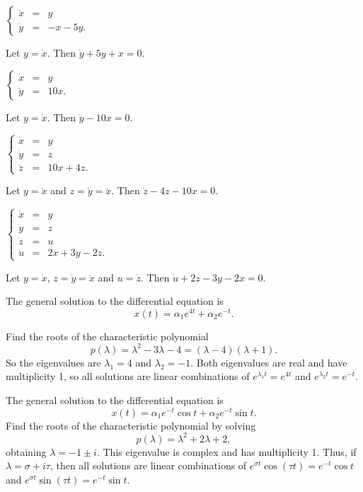  \ans $\left\{\begin{array}{rcl} \dot{x} & = & y \\
\dot{y} & = & -x-5y. \end{array}\right.$

\soln  Let $y = \dot{x}$.  Then $\dot{y}+5y+x=0$.


 \ans $\left\{\begin{array}{rcl} \dot{x} & = & y \\
\dot{y} & = & 10x. \end{array}\right.$

\soln  Let $y = \dot{x}$.  Then $\dot{y}-10x=0$.

\newpage
{} \ans $\left\{\begin{array}{rcl} \dot{x} & = & y \\
\dot{y} & = & z\\
\dot{z} & = & 10x+4z. \end{array}\right.$

\soln  Let $y = \dot{x}$ and $z=\dot{y}=\ddot{x}$.  Then 
$\dot{z}-4z-10x=0$.


 \ans $\left\{\begin{array}{rcl} \dot{x} & = & y \\
\dot{y} & = & z\\
\dot{z} & = & u\\
\dot{u} & = & 2x+3y-2z. \end{array}\right.$

\soln  Let $y = \dot{x}$, $z=\dot{y}=\ddot{x}$ and $u=\dot{z}$.  Then 
$\dot{u}+2z-3y-2x=0$.

 \ans The general solution to the differential equation is
\[
x(t) = \alpha_1e^{4t} + \alpha_2e^{-t}.
\]

\soln Find the roots of the characteristic polynomial
\[
p(\lambda) = \lambda^2 - 3\lambda - 4 = (\lambda - 4)(\lambda + 1).
\]
So the eigenvalues are $\lambda_1 = 4$ and $\lambda_2 = -1$.  Both eigenvalues
are real and have multiplicity 1, so all solutions are linear combinations of
$e^{\lambda_1 t} = e^{4t}$ and $e^{\lambda_2 t} = e^{-t}$.


 \ans The general solution to the differential equation is
\[
x(t) = \alpha_1e^{-t}\cos t + \alpha_2e^{-t}\sin t.
\]
\soln Find the roots of the characteristic polynomial by solving
\[
p(\lambda) = \lambda^2 + 2\lambda + 2,
\]
obtaining $\lambda = -1 \pm i$.  This eigenvalue is complex and has
multiplicity 1.  Thus, if $\lambda = \sigma + i\tau$, then all
solutions are linear combinations of $e^{\sigma t}\cos(\tau t) =
e^{-t}\cos t$ and $e^{\sigma t}\sin(\tau t) = e^{-t}\sin t$.

